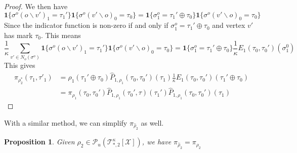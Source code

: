 \documentclass[12pt]{article}
\newtheorem{proposition}[theorem]{Proposition}
\newcommand{\one}[1]{\mathbf{1}\{#1\}}
\newcommand{\tree}[2]{\mathcal{T}_{*, #1}^{#2}[\mathcal{X}]}
\numberwithin{equation}{section}
\begin{document}
\begin{proof}
    We then have
    \begin{equation*}
        \one{\sigma^o(o\backslash v')_1 = \tau_1'}\one{\sigma^o(v'\backslash o)_0 = \tau_0} = \one{\sigma^o_1 = \tau_1' \oplus \tau_0}\one{\sigma^o(v'\backslash o)_0 = \tau_0}
    \end{equation*}
    Since the indicator function is non-zero if and only if $\sigma^o_1 = \tau_1' \oplus \tau_0$ and vertex $v'$ has mark $\tau_0$.
    This means
    \begin{equation*}
        \frac1\kappa \sum_{v'\in N_o(\sigma^o)}\one{\sigma^o(o\backslash v')_1 = \tau_1'}\one{\sigma^o(v'\backslash o)_0 = \tau_0} = \one{\sigma^o_1 = \tau_1' \oplus \tau_0}\frac1\kappa E_1(\tau_0, \tau_0')(\sigma^0_1)
    \end{equation*}
    This gives
    \begin{align*}
        \pi_{\rho_2^*}(\tau_1, \tau'_1) & = \rho_1(\tau_1' \oplus \tau_0)\widehat{P}_{1, \rho_1}(\tau_0, \tau_0')(\tau_1)\frac1\kappa E_1(\tau_0, \tau_0')(\tau_1' \oplus \tau_0) \\
                                        & = \pi_{\rho_1}(\tau_0, \tau_0')\widehat{P}_{1, \rho_1}(\tau_0', \tau)(\tau_1')\widehat{P}_{1, \rho_1}(\tau_0, \tau_0')(\tau_1)
    \end{align*}

\end{proof}

With a similar method, we can simplify $\pi_{\widehat{\rho}_2}$ as well.
\begin{proposition}
    Given $\rho_2\in\mathcal{P}_u(\tree{2}{\kappa})$, we have $\pi_{\widehat{\rho}_2} = \pi_{\rho_2}$
\end{proposition}
\end{document}
